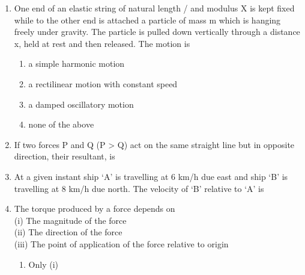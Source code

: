 \documentclass[11pt,a4paper]{article}
\begin{document}
\begin{enumerate}
\item{One end of an elastic string of natural length / and modulus X is kept fixed while to the other end is attached a particle of mass m which is hanging freely under gravity. The particle is pulled down vertically through a distance x, held at rest and then released. The motion is}
\begin{enumerate}[label=\Alph*.]
\item{a simple harmonic motion}
\item{a rectilinear motion with constant speed}
\item{a damped oscillatory motion}
\item{none of the above}
\end{enumerate}
\item{If two forces P and Q (P > Q) act on the same straight line but in opposite direction, their resultant, is}
\\
\item{At a given instant ship `A' is travelling at 6 km/h due east and ship `B' is travelling at 8 km/h due north. The velocity of `B' relative to `A' is
}
\\
\item{The torque produced by a force depends on \\
 (i) The magnitude of the force \\
 (ii) The direction of the force \\
 (iii) The point of application of the force relative to origin}
\begin{enumerate}[label=\Alph*.]
\item{Only (i)}

\end{enumerate}
\end{enumerate}
\end{document}
